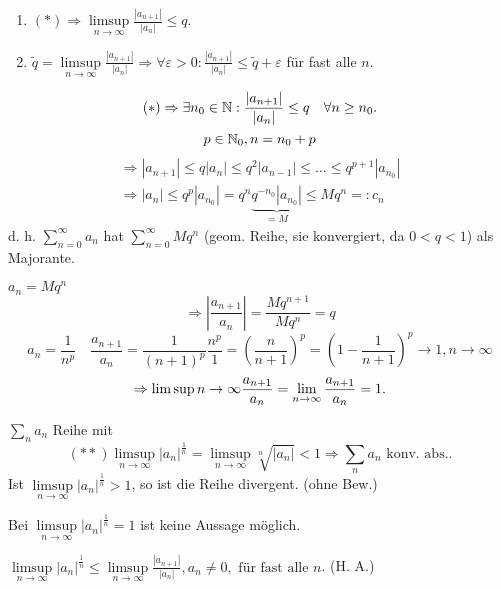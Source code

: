 \documentclass[../ana1.tex]{subfiles}
\begin{document}
\begin{bew}
	\begin{enumerate}
		\item \( (*) \Rightarrow \limsup\limits_{n\rightarrow\infty} \frac{|a_{n+1}|}{|a_n|} \leq q. \)
		\item \( \tilde{q} = \limsup\limits_{n\rightarrow\infty} \frac{|a_{n+1}|}{|a_n|} \Rightarrow \forall\varepsilon>0: \frac{|a_{n+1}|}{|a_n|} \leq \tilde{q} + \varepsilon \) für fast alle \(n\).
	\end{enumerate}
	\[ (*)\Rightarrow\exists n_0 \in\mathbb{N}: \frac{|a_{n+1}|}{|a_n|} \leq q \quad\forall n\geq n_0. \]
	\[ p\in\mathbb{N}_0, n=n_0 + p \]
	\begin{align*}
		\Rightarrow |a_{n+1}| \leq q |a_n| \leq q^2|a_{n-1}| \leq \dots\leq q^{p+1}|a_{n_0}|\\
		\Rightarrow |a_n| \leq q^p |a_{n_0}| = q^n \underbrace{q^{-n_0}|a_{n_0}|}_{=M} \leq M q^n =: c_n
	\end{align*}
	d. h. \( \sum_{n=0}^{\infty}a_n \) hat \( \sum_{n=0}^{\infty}M q^n \) (geom. Reihe, sie konvergiert, da \( 0<q<1 \)) als Majorante.
\end{bew}
\begin{bem}
	\( a_n = M q^n \)
	\[ \Rightarrow \left| \frac{a_{n+1}}{a_n} \right| = \frac{M q^{n+1}}{M q^n} = q \]
	\[ a_n = \frac{1}{n^p} \quad \frac{a_{n+1}}{a_n} = \frac{1}{(n+1)^p} \frac{n^p}{1} = \left(\frac{n}{n+1}\right)^p = \left(1 - \frac{1}{n+1}\right)^p \rightarrow 1, n\rightarrow\infty \]
	\[ \Rightarrow \limsup\limits{n\rightarrow\infty} \frac{a_{n+1}}{a_n} = \lim\limits_{n\rightarrow\infty} \frac{a_{n+1}}{a_n} = 1. \]
\end{bem}
\begin{satz}[Wurzelkriterium]
	\( \sum_{n}a_n \) Reihe mit \[ (**) \limsup\limits_{n\rightarrow\infty} |a_n|^{\frac{1}{n}} = \limsup\limits_{n\rightarrow\infty} \sqrt[n]{|a_n|} < 1 \Rightarrow \sum_n a_n \text{ konv. abs.}.\]
	Ist \( \limsup\limits_{n\rightarrow\infty} |a_n|^{\frac{1}{n}} > 1 \), so ist die Reihe divergent. (ohne Bew.) 
\end{satz}
\begin{bem}
	Bei \( \limsup\limits_{n\rightarrow\infty} |a_n|^{\frac{1}{n}} = 1 \) ist keine Aussage möglich.
\end{bem}
\begin{bem}
	\( \limsup\limits_{n\rightarrow\infty} |a_n|^{\frac{1}{n}} \leq \limsup\limits_{n\rightarrow\infty} \frac{|a_{n+1}|}{|a_n|}, a_n \neq 0, \text{ für fast alle } n \). (H. A.)
\end{bem}
\end{document}
